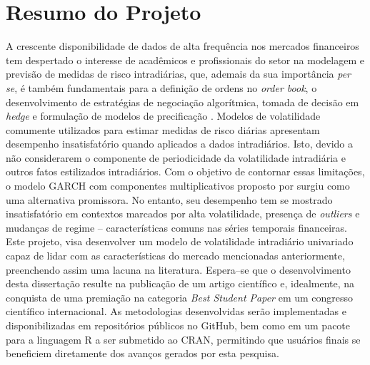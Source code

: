 \documentclass{article}
\begin{document}
\section{Resumo do Projeto}
A crescente disponibilidade de dados de alta frequência nos mercados financeiros tem despertado o interesse de acadêmicos e profissionais do setor na modelagem e previsão de medidas de risco intradiárias, que, ademais da sua importância \textit{per se}, é também fundamentais para a definição de ordens no \textit{order book}, o desenvolvimento de estratégias de negociação algorítmica, tomada de decisão em \textit{hedge} e formulação de modelos de precificação \citep{Engle_Sokalska_2012, Stroud_Johannes_2014, Rossi_Fantazzini_2015}. Modelos de volatilidade comumente utilizados para estimar medidas de risco diárias apresentam desempenho insatisfatório quando aplicados a dados intradiários. Isto, devido a não considerarem o componente de periodicidade da volatilidade intradiária e outros fatos estilizados intradiários. Com o objetivo de contornar essas limitações, o modelo GARCH com componentes multiplicativos proposto por \citet{Engle_Sokalska_2012} surgiu como uma alternativa promissora. No entanto, seu desempenho tem se mostrado insatisfatório em contextos marcados por alta volatilidade, presença de \textit{outliers} e mudanças de regime -- características comuns nas séries temporais financeiras. Este projeto, visa desenvolver um modelo de volatilidade intradiário univariado capaz de lidar com as características do mercado mencionadas anteriormente, preenchendo assim uma lacuna na literatura. Espera--se que o desenvolvimento desta dissertação resulte na publicação de um artigo científico e, idealmente, na conquista de uma premiação na categoria \textit{Best Student Paper} em um congresso científico internacional. As metodologias desenvolvidas serão implementadas e disponibilizadas em repositórios públicos no GitHub, bem como em um pacote para a linguagem R a ser submetido ao CRAN, permitindo que usuários finais se beneficiem diretamente dos avanços gerados por esta pesquisa.
\end{document}
